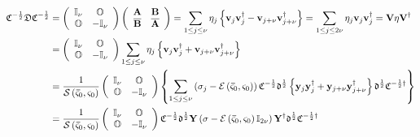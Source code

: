 \documentclass[aps,preprint]{revtex4}%
\begin{document}
\begin{align}
\mathfrak{C}^{-\frac{1}{2}}\mathfrak{DC}^{-\frac{1}{2}}  &  =\left(
\begin{array}
[c]{cc}%
\mathbb{I}_{\nu} & \mathbb{O}\\
\mathbb{O} & -\mathbb{I}_{\nu}%
\end{array}
\right)  \left(
\begin{array}
[c]{cc}%
\mathbf{A} & \mathbf{B}\\
\overline{\mathbf{B}} & \overline{\mathbf{A}}%
\end{array}
\right)  =\sum_{1\leq j\leq\nu}\eta_{j}\left\{  \mathbf{v}_{j}\mathbf{v}%
_{j}^{\dagger}-\mathbf{v}_{j+\nu}\mathbf{v}_{j+\nu}^{\dagger}\right\}
=\sum_{1\leq j\leq2\nu}\eta_{j}\mathbf{v}_{j}\mathbf{v}_{j}^{\dagger
}=\mathbf{V\eta V}^{\dagger}\\
&  =\left(
\begin{array}
[c]{cc}%
\mathbb{I}_{\nu} & \mathbb{O}\\
\mathbb{O} & -\mathbb{I}_{\nu}%
\end{array}
\right)  \sum_{1\leq j\leq\nu}\eta_{j}\left\{  \mathbf{v}_{j}\mathbf{v}%
_{j}^{\dagger}+\mathbf{v}_{j+\nu}\mathbf{v}_{j+\nu}^{\dagger}\right\} \\
&  =\frac{1}{\mathcal{S}\left(  \mathbf{\bar{\varsigma}}_{0},\mathbf{\varsigma
}_{0}\right)  }\left(
\begin{array}
[c]{cc}%
\mathbb{I}_{\nu} & \mathbb{O}\\
\mathbb{O} & -\mathbb{I}_{\nu}%
\end{array}
\right)  \left\{  \sum_{1\leq j\leq\nu}\left(  \sigma_{j}-\mathcal{E}\left(
\mathbf{\bar{\varsigma}}_{0},\mathbf{\varsigma}_{0}\right)  \right)
\mathfrak{C}^{-\frac{1}{2}}\mathfrak{\Delta}^{\frac{1}{2}}\left\{
\mathbf{y}_{j}\mathbf{y}_{j}^{\dagger}+\mathbf{y}_{j+\nu}\mathbf{y}_{j+\nu
}^{\dagger}\right\}  \mathfrak{\Delta}^{\frac{1}{2}}\mathfrak{C}^{-\frac{1}%
{2}\dagger}\right\} \\
&  =\frac{1}{\mathcal{S}\left(  \mathbf{\bar{\varsigma}}_{0},\mathbf{\varsigma
}_{0}\right)  }\left(
\begin{array}
[c]{cc}%
\mathbb{I}_{\nu} & \mathbb{O}\\
\mathbb{O} & -\mathbb{I}_{\nu}%
\end{array}
\right)  \mathfrak{C}^{-\frac{1}{2}}\mathfrak{\Delta}^{\frac{1}{2}}%
\mathbf{Y}\left(  \mathbf{\sigma}-\mathcal{E}\left(  \mathbf{\bar{\varsigma}%
}_{0},\mathbf{\varsigma}_{0}\right)  \mathbb{I}_{2\nu}\right)  \mathbf{Y}%
^{\dagger}\mathfrak{\Delta}^{\frac{1}{2}}\mathfrak{C}^{-\frac{1}{2}\dagger}%
\end{align}
\end{document}
